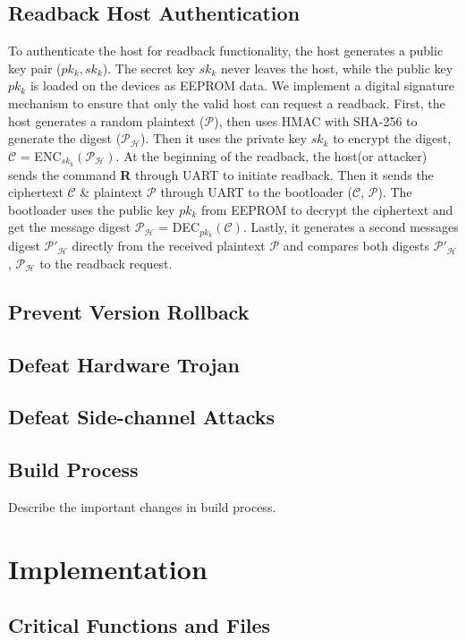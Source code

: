 \documentclass[11pt,oneside,onecolumn,letterpaper]{article}
\begin{document}
\subsection{Readback Host Authentication}
To authenticate the host for readback functionality, the host generates a public key pair ($pk_k, sk_k$).
The secret key $sk_k$ never leaves the host, while the public key $pk_k$ is loaded on the devices as EEPROM data.
We implement a digital signature mechanism to ensure that only the valid host can request a readback.
First, the host generates a random plaintext ($\mathcal{P}$), then uses HMAC with SHA-256 to generate the digest ($\mathcal{P_H}$).
Then it uses the private key $sk_k$ to encrypt the digest, $\mathcal{C}$ = ENC$_{sk_k}(\mathcal{P_H})$.
At the beginning of the readback, the host(or attacker) sends the command \textbf{R} through UART to initiate readback.
Then it sends the ciphertext $\mathcal{C}$ \& plaintext $\mathcal{P}$ through UART to the bootloader ($\mathcal{C}$, $\mathcal{P}$).
The bootloader uses the public key $pk_k$ from EEPROM to decrypt the ciphertext and get the message digest $\mathcal{P_H}$ = DEC$_{pk_k}(\mathcal{C})$.
Lastly, it generates a second messages digest $\mathcal{P'_H}$ directly from the received plaintext $\mathcal{P}$ and compares both digests $\mathcal{P'_H}$, $\mathcal{P_H}$ to the readback request.

\subsection{Prevent Version Rollback}
  
\subsection{Defeat Hardware Trojan}

\subsection{Defeat Side-channel Attacks}

\subsection{Build Process}

  Describe the important changes in build process.

\section{Implementation}
\subsection{Critical Functions and Files}



\end{document}
